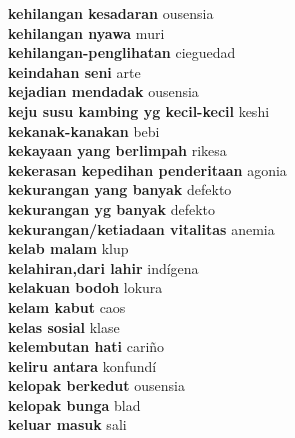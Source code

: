 \textbf{ kehilangan kesadaran  } ousensia \\
\textbf{ kehilangan nyawa  } muri \\
\textbf{ kehilangan-penglihatan  } cieguedad \\
\textbf{ keindahan seni  } arte \\
\textbf{ kejadian mendadak  } ousensia \\
\textbf{ keju susu kambing yg kecil-kecil  } keshi \\
\textbf{ kekanak-kanakan  } bebi \\
\textbf{ kekayaan yang berlimpah  } rikesa \\
\textbf{ kekerasan kepedihan penderitaan  } agonia \\
\textbf{ kekurangan yang banyak  } defekto \\
\textbf{ kekurangan yg banyak  } defekto \\
\textbf{ kekurangan/ketiadaan vitalitas  } anemia \\
\textbf{ kelab malam  } klup \\
\textbf{ kelahiran,dari lahir  } indígena \\
\textbf{ kelakuan bodoh  } lokura \\
\textbf{ kelam kabut  } caos \\
\textbf{ kelas sosial  } klase \\
\textbf{ kelembutan hati  } cariño \\
\textbf{ keliru antara  } konfundí \\
\textbf{ kelopak berkedut  } ousensia \\
\textbf{ kelopak bunga  } blad \\
\textbf{ keluar masuk  } sali \\
